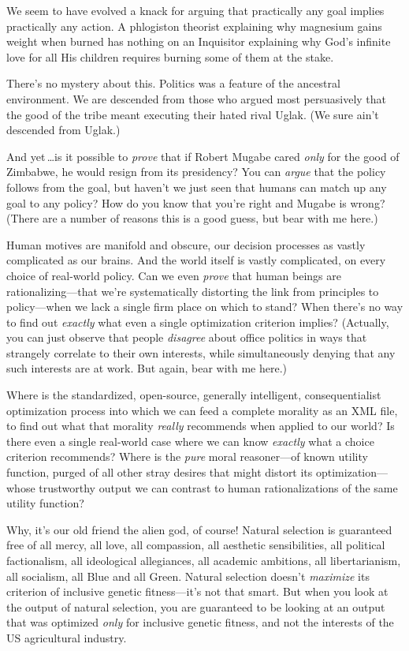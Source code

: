 {{
 We seem to have evolved a knack for arguing that practically any
goal implies practically any action. A phlogiston theorist explaining
why magnesium gains weight when burned has nothing on an Inquisitor
explaining why God's infinite love for all His children
requires burning some of them at the stake.}

{
 There's no mystery about this. Politics was a
feature of the ancestral environment. We are descended from those who
argued most persuasively that the good of the tribe meant executing
their hated rival Uglak. (We sure ain't descended from
Uglak.)}

{
 And yet\,\ldots is it possible to \textit{prove} that if Robert
Mugabe cared \textit{only} for the good of Zimbabwe, he would resign
from its presidency? You can \textit{argue} that the policy follows
from the goal, but haven't we just seen that humans can
match up any goal to any policy? How do you know that
you're right and Mugabe is wrong? (There are a number
of reasons this is a good guess, but bear with me here.)}

{
 Human motives are manifold and obscure, our decision processes as
vastly complicated as our brains. And the world itself is vastly
complicated, on every choice of real-world policy. Can we even
\textit{prove} that human beings are rationalizing---that
we're systematically distorting the link from
principles to policy---when we lack a single firm place on which to
stand? When there's no way to find out \textit{exactly}
what even a single optimization criterion implies? (Actually, you can
just observe that people \textit{disagree} about office politics in
ways that strangely correlate to their own interests, while
simultaneously denying that any such interests are at work. But again,
bear with me here.)}

{
 Where is the standardized, open-source, generally intelligent,
consequentialist optimization process into which we can feed a complete
morality as an XML file, to find out what that morality \textit{really}
recommends when applied to our world? Is there even a single real-world
case where we can know \textit{exactly} what a choice criterion
recommends? Where is the \textit{pure} moral reasoner---of known
utility function, purged of all other stray desires that might distort
its optimization---whose trustworthy output we can contrast to human
rationalizations of the same utility function?}

{
 Why, it's our old friend the alien god, of course!
Natural selection is guaranteed free of all mercy, all love, all
compassion, all aesthetic sensibilities, all political factionalism,
all ideological allegiances, all academic ambitions, all
libertarianism, all socialism, all Blue and all Green. Natural
selection doesn't \textit{maximize} its criterion of
inclusive genetic fitness---it's not that smart. But
when you look at the output of natural selection, you are guaranteed to
be looking at an output that was optimized \textit{only} for inclusive
genetic fitness, and not the interests of the US agricultural
industry.}

}
